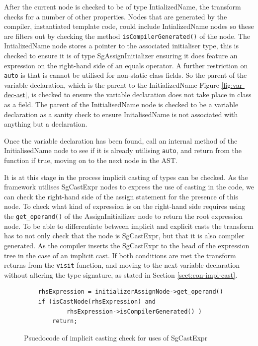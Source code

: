 \documentclass[bsc,frontabs,singlespacing,twoside,parskip,deptreport]{infthesis}
\begin{document}
After the current node is checked to be of type IntializedName, the transform checks for a number of other properties. Nodes that are generated by the compiler, instantiated template code, could include IntializedName nodes so these are filters out by checking the method \texttt{isCompilerGenerated()} of the node. The IntializedName node stores a pointer to the associated initialiser type, this is checked to ensure it is of type SgAssignInitializer ensuring it does feature an expression on the right-hand side of an equals operator. A further restriction on \texttt{auto} is that is cannot be utilised for non-static class fields. So the parent of the variable declaration, which is the parent to the InitializedName Figure \ref{fig:var-dec-ast}, is checked to ensure the variable declaration does not take place in class as a field. The parent of the InitialisedName node is checked to be a variable declaration as a sanity check to ensure InitalisedName is not associated with anything but a declaration. 

Once the variable declaration has been found, call an internal method of the InitialisedName node to see if it is already utilising \texttt{auto}, and return from the function if true, moving on to the next node in the AST. 

It is at this stage in the process implicit casting of types can be checked. As the framework utilises SgCastExpr nodes to express the use of casting in the code, we can check the right-hand side of the assign statement for the presence of this node. To check what kind of expression is on the right-hand side requires using the \texttt{get\_operand()} of the AssignInitiailizer node to return the root expression node. To be able to differentiate between implicit and explicit casts the transform has to not only check that the node is SgCastExpr, but that it is also compiler generated. As the compiler inserts the SgCastExpr to the head of the expression tree in the case of an implicit cast. If both conditions are met the transform returns from the \texttt{visit} function, and moving to the next variable declaration without altering the type signature, as stated in Section \ref{sect:con-impl-cast}. 

\begin{figure}[!h]
    \centering
    \begin{verbatim}
    rhsExpression = initializerAssignNode->get_operand()
    if (isCastNode(rhsExpression) and 
            rhsExpression->isCompilerGenerated() )
        return;
    \end{verbatim}
    \caption{Psuedocode of implicit casting check for uses of SgCastExpr}
    \label{fig:cast-check-code}
\end{figure}
\end{document}

